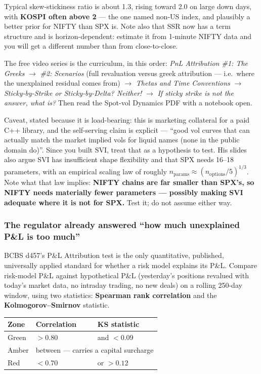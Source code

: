 \documentclass[11pt,a4paper]{article}
\newcommand{\srcnote}[1]{{\footnotesize\color{soft}#1\par}}
\begin{document}
Typical skew-stickiness ratio is about 1.3, rising toward 2.0 on large down days,
with \textbf{KOSPI often above 2} --- the one named non-US index, and plausibly a
better prior for NIFTY than SPX is. Note also that SSR now has a term structure
and is horizon-dependent: estimate it from 1-minute NIFTY data and you will get a
different number than from close-to-close.

The free video series is the curriculum, in this order: \emph{PnL Attribution \#1:
The Greeks} $\to$ \emph{\#2: Scenarios} (full revaluation versus greek attribution
--- i.e.\ where the unexplained residual comes from) $\to$ \emph{Thetas and Time
Conventions} $\to$ \emph{Sticky-by-Strike or Sticky-by-Delta? Neither!} $\to$
\emph{If sticky strike is not the answer, what is?} Then read the Spot-vol
Dynamics PDF with a notebook open.

\srcnote{Caveat, stated because it is load-bearing: this is marketing collateral
for a paid C++ library, and the self-serving claim is explicit --- ``good vol
curves that can actually match the market implied vols for liquid names (none in
the public domain do)''. Since you built SVI, treat that as a hypothesis to test.
His slides also argue SVI has insufficient shape flexibility and that SPX needs
16--18 parameters, with an empirical scaling law of roughly
$n_{\text{params}} \approx (n_{\text{options}}/5)^{1/3}$. Note what that law
implies: \textbf{NIFTY chains are far smaller than SPX's, so NIFTY needs
materially fewer parameters --- possibly making SVI adequate where it is not for
SPX.} Test it; do not assume either way.}

\subsubsection{The regulator already answered ``how much unexplained P\&L is too much''}

BCBS d457's P\&L Attribution test is the only quantitative, published,
universally applied standard for whether a risk model explains its P\&L. Compare
risk-model P\&L against hypothetical P\&L (yesterday's positions revalued with
today's market data, no intraday trading, no new deals) on a rolling 250-day
window, using two statistics: \textbf{Spearman rank correlation} and the
\textbf{Kolmogorov--Smirnov} statistic.

\begin{center}
\begin{tabular}{@{}lll@{}}
\toprule
Zone & Correlation & KS statistic \\
\midrule
Green & $> 0.80$ & and $< 0.09$ \\
Amber & \multicolumn{2}{l}{between --- carries a capital surcharge} \\
Red   & $< 0.70$ & or $> 0.12$ \\
\bottomrule
\end{tabular}
\end{center}
\end{document}
